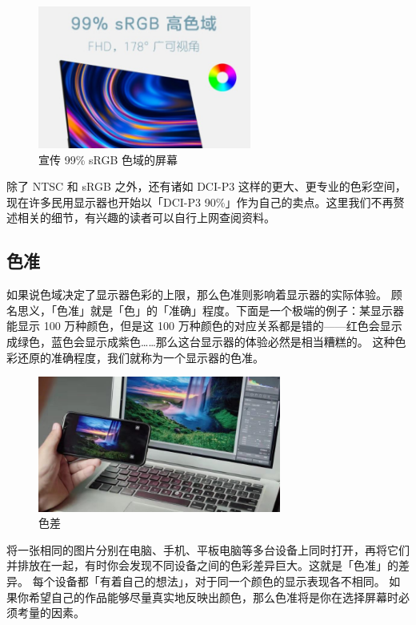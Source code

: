 \begin{figure}[htb!]
  \centering
  \includegraphics[width=7cm]{assets/99_sRGB_Ad.jpg}
  \caption{宣传 99\% sRGB 色域的屏幕}
  \label{99_sRGB_Ad}
\end{figure}

除了 NTSC 和 sRGB 之外，还有诸如 DCI-P3 这样的更大、更专业的色彩空间，现在许多民用显示器也开始以「DCI-P3 90\%」作为自己的卖点。这里我们不再赘述相关的细节，有兴趣的读者可以自行上网查阅资料。

\subsection{色准}

如果说色域决定了显示器色彩的上限，那么色准则影响着显示器的实际体验。
顾名思义，「色准」就是「色」的「准确」程度。下面是一个极端的例子：某显示器能显示 100 万种颜色，但是这 100 万种颜色的对应关系都是错的——红色会显示成绿色，蓝色会显示成紫色……那么这台显示器的体验必然是相当糟糕的。
这种色彩还原的准确程度，我们就称为一个显示器的色准。

\begin{figure}[htb!]
  \centering
  \includegraphics[width=8cm]{assets/Off_Color.jpg}
  \caption{色差}
  \label{Off_Color}
\end{figure}

将一张相同的图片分别在电脑、手机、平板电脑等多台设备上同时打开，再将它们并排放在一起，有时你会发现不同设备之间的色彩差异巨大。这就是「色准」的差异。
每个设备都「有着自己的想法」，对于同一个颜色的显示表现各不相同。
如果你希望自己的作品能够尽量真实地反映出颜色，那么色准将是你在选择屏幕时必须考量的因素。

